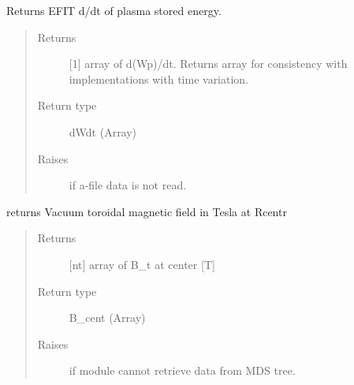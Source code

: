 \documentclass[letterpaper,10pt,english]{sphinxmanual}
\begin{document}
\begin{fulllineitems}
\begin{fulllineitems}
\begin{quote}
\begin{description}
\end{description}\end{quote}

\end{fulllineitems}


\begin{fulllineitems}
\label{\detokenize{eqtools:eqtools.eqdskreader.EqdskReader.getWpdot}}
Returns EFIT d/dt of plasma stored energy.
\begin{quote}\begin{description}
\item[{Returns}] \leavevmode
{[}1{]} array of d(Wp)/dt.  Returns array for consistency
with {\hyperref[\detokenize{eqtools:eqtools.core.Equilibrium}]{}}
implementations with time variation.

\item[{Return type}] \leavevmode
dWdt (Array)

\item[{Raises}] \leavevmode
{} \textendash{} if a-file data is not read.

\end{description}\end{quote}

\end{fulllineitems}


\begin{fulllineitems}
\label{\detokenize{eqtools:eqtools.eqdskreader.EqdskReader.getBCentr}}
returns Vacuum toroidal magnetic field in Tesla at Rcentr
\begin{quote}\begin{description}
\item[{Returns}] \leavevmode
{[}nt{]} array of B\_t at center {[}T{]}

\item[{Return type}] \leavevmode
B\_cent (Array)

\item[{Raises}] \leavevmode
{} \textendash{} if module cannot retrieve data from MDS tree.


\end{description}
\end{quote}
\end{fulllineitems}
\end{fulllineitems}
\end{document}
